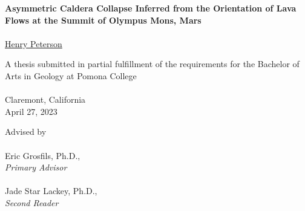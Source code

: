 \renewcommand{\headrulewidth}{0pt} %
\begin{titlepage}
    \begin{center}

        \phantom{.}
        \vfill
        \vfill
        \large\textbf{Asymmetric Caldera Collapse Inferred from the Orientation of Lava Flows at the Summit of Olympus Mons, Mars}
        \\~\\
        \href{mailto:hgpa2018@mymail.pomona.edu}{Henry Peterson}

        \vfill
        \vfill

        A thesis submitted in partial fulfillment of the requirements for the Bachelor of Arts in Geology at Pomona College\\~\\
        Claremont, California\\
        April 27, 2023

        \vfill
        \phantom{.}

        \newpage

        \phantom{.}
        \vfill
        Advised by
        \\~\\
        Eric Grosfils, Ph.D.,\\
        \emph{Primary Advisor}
        \\~\\
        Jade Star Lackey, Ph.D.,\\
        \emph{Second Reader}
        \vfill
        \phantom{.}

    \end{center}
\end{titlepage}

\renewcommand{\headrulewidth}{0.5pt}